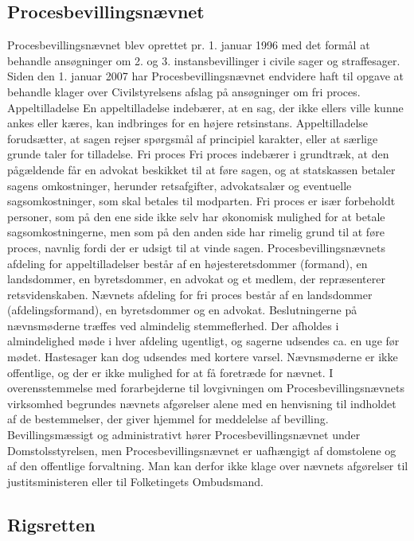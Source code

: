\documentclass[]{book}
\begin{document}
\hypertarget{procesbevillingsnvnet}{%
\subsection{Procesbevillingsnævnet}\label{procesbevillingsnvnet}}

Procesbevillingsnævnet blev oprettet pr. 1. januar 1996 med det formål at behandle ansøgninger om 2. og 3. instansbevillinger i civile sager og straffesager. Siden den 1. januar 2007 har Procesbevillingsnævnet endvidere haft til opgave at behandle klager over Civilstyrelsens afslag på ansøgninger om fri proces.
Appeltilladelse
En appeltilladelse indebærer, at en sag, der ikke ellers ville kunne ankes eller kæres, kan indbringes for en højere retsinstans. Appeltilladelse forudsætter, at sagen rejser spørgsmål af principiel karakter, eller at særlige grunde taler for tilladelse.
Fri proces
Fri proces indebærer i grundtræk, at den pågældende får en advokat beskikket til at føre sagen, og at statskassen betaler sagens omkostninger, herunder retsafgifter, advokatsalær og eventuelle sagsomkostninger, som skal betales til modparten. Fri proces er især forbeholdt personer, som på den ene side ikke selv har økonomisk mulighed for at betale sagsomkostningerne, men som på den anden side har rimelig grund til at føre proces, navnlig fordi der er udsigt til at vinde sagen.
Procesbevillingsnævnets afdeling for appeltilladelser består af en højesteretsdommer (formand), en landsdommer, en byretsdommer, en advokat og et medlem, der repræsenterer retsvidenskaben.
Nævnets afdeling for fri proces består af en landsdommer (afdelingsformand), en byretsdommer og en advokat.
Beslutningerne på nævnsmøderne træffes ved almindelig stemmeflerhed. Der afholdes i almindelighed møde i hver afdeling ugentligt, og sagerne udsendes ca. en uge før mødet. Hastesager kan dog udsendes med kortere varsel. Nævnsmøderne er ikke offentlige, og der er ikke mulighed for at få foretræde for nævnet.
I overensstemmelse med forarbejderne til lovgivningen om Procesbevillingsnævnets virksomhed begrundes nævnets afgørelser alene med en henvisning til indholdet af de bestemmelser, der giver hjemmel for meddelelse af bevilling.
Bevillingsmæssigt og administrativt hører Procesbevillingsnævnet under Domstolsstyrelsen, men Procesbevillingsnævnet er uafhængigt af domstolene og af den offentlige forvaltning. Man kan derfor ikke klage over nævnets afgørelser til justitsministeren eller til Folketingets Ombudsmand.

\hypertarget{rigsretten}{%
\subsection{Rigsretten}\label{rigsretten}}
\end{document}
